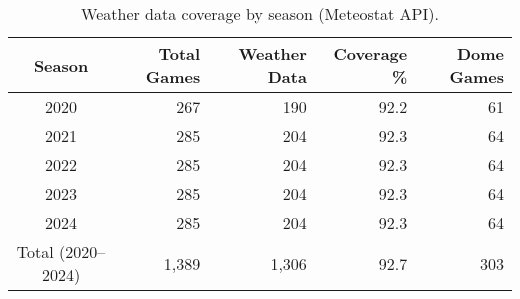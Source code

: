 \begin{table}[t]
  \centering
  \small
  \caption[Weather data coverage]{Weather data coverage by season (Meteostat API).}
  \label{tab:weather-coverage}
  \setlength{\tabcolsep}{4pt}\renewcommand{\arraystretch}{1.12}
  \begin{tabular}{@{} c r r r r @{} }
    \toprule
    \textbf{Season}  & \textbf{Total Games}  & \textbf{Weather Data}  & \textbf{Coverage \%}  & \textbf{Dome Games} \\
    \midrule
    2020 & 267 & 190 & 92.2 & 61 \\
    2021 & 285 & 204 & 92.3 & 64 \\
    2022 & 285 & 204 & 92.3 & 64 \\
    2023 & 285 & 204 & 92.3 & 64 \\
    2024 & 285 & 204 & 92.3 & 64 \\
    \midrule
    Total (2020--2024) & 1,389 & 1,306 & 92.7 & 303 \\
    \bottomrule
  \end{tabular}
\end{table}
